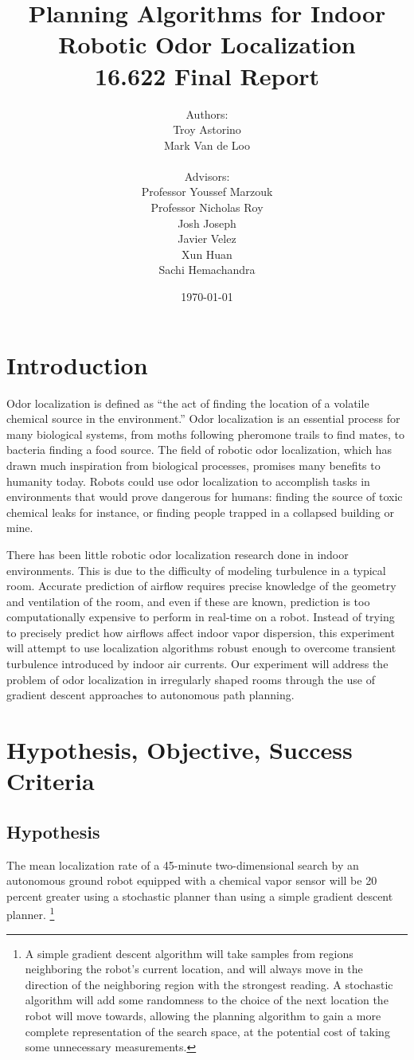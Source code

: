 \documentclass[submit]{aiaa-pretty-modified}
\title{\textbf{Planning Algorithms for Indoor Robotic Odor
    Localization}\\
{16.622 Final Report}}
\date{\today}
\author{Authors: \\Troy Astorino \\ Mark Van de Loo \\
  \\ 
  Advisors:\\ Professor Youssef Marzouk \\ Professor Nicholas
    Roy \\ Josh Joseph \\ Javier Velez \\ Xun Huan \\ Sachi Hemachandra}
\begin{document}
\maketitle

\newpage

\tableofcontents

\newpage

\section{Introduction}

Odor localization is defined as ``the act of finding the location of a
volatile chemical source in the environment.''\cite{kowadlo} Odor
localization is an essential process for many biological systems, from
moths following pheromone trails to find mates, to bacteria finding a
food source. The field of robotic odor localization, which has drawn
much inspiration from biological processes, promises many benefits to
humanity today. Robots could use odor localization to accomplish tasks
in environments that would prove dangerous for humans: finding the
source of toxic chemical leaks for instance, or finding people
trapped in a collapsed building or mine.

There has been little robotic odor localization research done in indoor
environments. This is due to the difficulty of modeling turbulence in a typical
room. Accurate prediction of airflow requires precise knowledge of the geometry
and ventilation of the room, and even if these are known, prediction is too
computationally expensive to perform in real-time on a robot. Instead of trying
to precisely predict how airflows affect indoor vapor dispersion, this
experiment will attempt to use localization algorithms robust enough to overcome
transient turbulence introduced by indoor air currents. Our experiment will
address the problem of odor localization in irregularly shaped rooms through the
use of gradient descent approaches to autonomous path planning.

\section{Hypothesis, Objective, Success Criteria}
\label{sec:hos}
\subsection*{Hypothesis} 
The mean localization rate of a 45-minute two-dimensional search by an
autonomous ground robot equipped with a chemical vapor sensor will be
20 percent greater using a stochastic planner than using a simple gradient descent planner.
\footnote{
  A simple gradient descent algorithm will
  take samples from regions neighboring the robot’s current location, 
  and will always move in the direction of the neighboring region with
  the strongest reading. A stochastic algorithm will add some randomness
  to the choice of the next location the robot will move towards,
  allowing the planning algorithm to gain a more complete representation
  of the search space, at the potential cost of taking some unnecessary
  measurements.}
\end{document}
